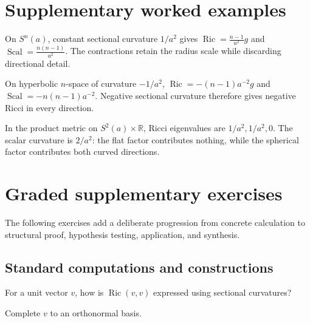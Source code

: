 \section{Supplementary worked examples}
\label{sec:vii27-pedagogy}

\begin{example}\label{ex:vii27-ped-01}
On \(S^n(a)\), constant sectional curvature \(1/a^2\) gives \(\operatorname{Ric}=\frac{n-1}{a^2}g\) and \(\operatorname{Scal}=\frac{n(n-1)}{a^2}\).  The contractions retain the radius scale while discarding directional detail.
\end{example}

\begin{example}\label{ex:vii27-ped-02}
On hyperbolic \(n\)-space of curvature \(-1/a^2\), \(\operatorname{Ric}=-(n-1)a^{-2}g\) and \(\operatorname{Scal}=-n(n-1)a^{-2}\).  Negative sectional curvature therefore gives negative Ricci in every direction.
\end{example}

\begin{example}\label{ex:vii27-ped-03}
In the product metric on \(S^2(a)\times\mathbb R\), Ricci eigenvalues are \(1/a^2,1/a^2,0\).  The scalar curvature is \(2/a^2\): the flat factor contributes nothing, while the spherical factor contributes both curved directions.
\end{example}

\section{Graded supplementary exercises}
The following exercises add a deliberate progression from concrete calculation to structural proof, hypothesis testing, application, and synthesis.

\subsection*{Standard computations and constructions}

\begin{exercise}\label{exr:vii27-ped-01}
For a unit vector \(v\), how is \(\operatorname{Ric}(v,v)\) expressed using sectional curvatures?
\end{exercise}

\begin{hint}
Complete \(v\) to an orthonormal basis.
\end{hint}

